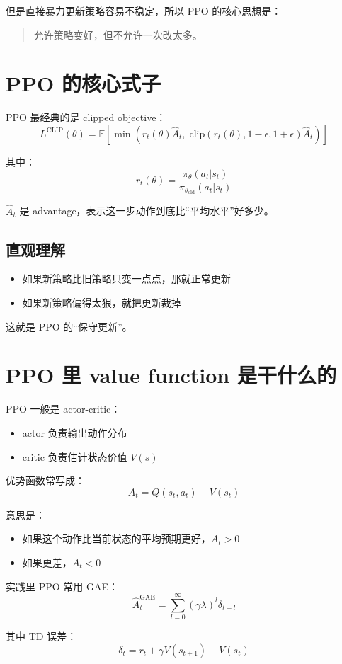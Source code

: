\documentclass[11pt,a4paper]{article}
\begin{document}
但是直接暴力更新策略容易不稳定，所以 PPO 的核心思想是：

\begin{quote}
允许策略变好，但不允许一次改太多。
\end{quote}

\section{PPO 的核心式子}
PPO 最经典的是 clipped objective：
\[
L^{\text{CLIP}}(\theta)
=
\mathbb{E}\left[
\min\left(
r_t(\theta)\hat A_t,\;
\text{clip}(r_t(\theta),1-\epsilon,1+\epsilon)\hat A_t
\right)
\right]
\]

其中：
\[
r_t(\theta)=
\frac{\pi_\theta(a_t|s_t)}
{\pi_{\theta_{\text{old}}}(a_t|s_t)}
\]

$\hat A_t$ 是 advantage，表示这一步动作到底比“平均水平”好多少。

\subsection{直观理解}
\begin{itemize}
\item 如果新策略比旧策略只变一点点，那就正常更新
\item 如果新策略偏得太狠，就把更新裁掉
\end{itemize}

这就是 PPO 的“保守更新”。

\section{PPO 里 value function 是干什么的}
PPO 一般是 actor-critic：
\begin{itemize}
\item actor 负责输出动作分布
\item critic 负责估计状态价值 $V(s)$
\end{itemize}

优势函数常写成：
\[
A_t = Q(s_t,a_t)-V(s_t)
\]

意思是：
\begin{itemize}
\item 如果这个动作比当前状态的平均预期更好，$A_t>0$
\item 如果更差，$A_t<0$
\end{itemize}

实践里 PPO 常用 GAE：
\[
\hat A_t^{\text{GAE}}=\sum_{l=0}^{\infty}(\gamma\lambda)^l\delta_{t+l}
\]

其中 TD 误差：
\[
\delta_t=r_t+\gamma V(s_{t+1})-V(s_t)
\]
\end{document}
